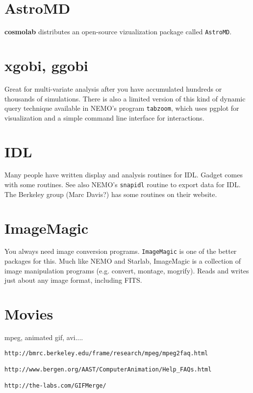 \section{AstroMD}

{\bf cosmolab} distributes an open-source vizualization package 
called {\tt AstroMD}.

\section{xgobi, ggobi}

Great for multi-variate analysis after you have accumulated hundreds
or thousands of simulations. There is also a limited version of
this kind of dynamic query technique available in 
NEMO's program {\tt tabzoom}, which uses pgplot for visualization
and a simple command line interface for interactions.


\section{IDL}

Many people have written display and 
analysis routines for IDL. Gadget comes with some
routines. See also NEMO's {\tt snapidl} routine to export data for IDL.
The Berkeley group (Marc Davis?) has some routines on their website.


\section{ImageMagic}

You always need image conversion programs. {\tt ImageMagic} is one of 
the better packages for this. Much like NEMO and Starlab, ImageMagic
is a collection of image manipulation programs (e.g. convert, montage, mogrify).
Reads and writes just about any image format, including FITS.

\section{Movies}

mpeg, animated gif, avi....

\begin{verbatim}
http://bmrc.berkeley.edu/frame/research/mpeg/mpeg2faq.html

http://www.bergen.org/AAST/ComputerAnimation/Help_FAQs.html

http://the-labs.com/GIFMerge/

\end{verbatim}

